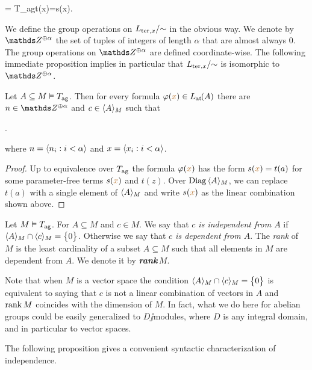 \documentclass[creche.tex]{subfiles}
\begin{document}
%
{=}%
{T_{\rm ag}\proves t({\mr x})=s({\mr x}).}

We define the group operations on $L_{{\rm ter},x}/\mathord{\sim}$ in the obvious way. We denote by $\ZZ^{\oplus\alpha}$ the set of tuples of integers of length $\alpha$ that are almost always $0$. The group operations on $\ZZ^{\oplus\alpha}$ are defined coordinate-wise. The following immediate proposition implies in particular that  $L_{{\rm ter},x}/\mathord{\sim}$ is isomorphic to $\ZZ^{\oplus\alpha}$.

\begin{proposition}
\label{corol_formacanonicaterminimoduli}
Let $A\subseteq M\models T_{\rm ag}$. Then for every formula $\phi({\mr x})\in\atL(A)$ there are $n\in\ZZ^{\oplus\alpha}$ and $c\in\<A\>_M$ such that 

.

where $n=\<n_i:i<\alpha\>$ and  $x=\<x_i:i<\alpha\>$.\QED

\end{proposition}

\begin{proof}
Up to equivalence over $T_{\rm ag}$ the formula $\phi({\mr x})$ has the form $s({\mr x})=t(a)$ for some parameter-free terms $s({\mr x})$ and $t(z)$. Over $\Diag\,\<A\>_M$, we can replace $t(a)$ with a single element of  $\<A\>_M$ and write $s({\mr x})$ as the linear combination shown above.
\end{proof}


\begin{definition} Let $M\models T_{\rm ag}$. For $A\subseteq M$ and  $c\in M$. We say that  \emph{$c$ is independent from $A$\/} if $\<A\>_M\cap\<c\>_M=\big\{0\big\}$. Otherwise we say that \emph{$c$ is dependent from $A$}. The \emph{rank\/} of $M$ is the least cardinality of a subset $A\subseteq M$ such that all elements in $M$ are dependent from $A$. We denote it by \emph{\rm\bf rank\,$M$}.\QED
\end{definition}  

Note that when $M$ is a vector space the condition $\<A\>_M\cap\<c\>_M=\big\{0\big\}$ is equivalent to saying that $c$ is not a linear combination of vectors in $A$ and $\rank M$ coincides with the dimension of $M$. In fact, what we do here for abelian groups could be easily generalized to $D\jj$modules, where $D$ is any integral domain, and in particular to vector spaces.

The following proposition gives a convenient syntactic characterization of independence.
\end{document}
